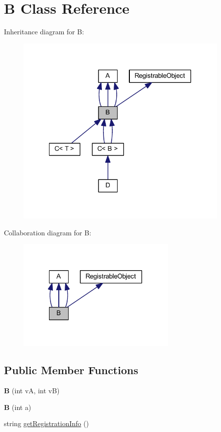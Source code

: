 \hypertarget{class_b}{
\section{B Class Reference}
\label{class_b}
}


Inheritance diagram for B:\nopagebreak
\begin{figure}[H]
\begin{center}
\leavevmode
\includegraphics[width=296pt]{class_b__inherit__graph}
\end{center}
\end{figure}


Collaboration diagram for B:\nopagebreak
\begin{figure}[H]
\begin{center}
\leavevmode
\includegraphics[width=221pt]{class_b__coll__graph}
\end{center}
\end{figure}
\subsection*{Public Member Functions}
\begin{DoxyCompactItemize}
\item 
\hypertarget{class_b_ab119ce136a0cb0a32835b580e65a5467}{
{\bfseries B} (int vA, int vB)}
\label{class_b_ab119ce136a0cb0a32835b580e65a5467}

\item 
\hypertarget{class_b_a649478177af5ec5962deac6fbbc6510b}{
{\bfseries B} (int a)}
\label{class_b_a649478177af5ec5962deac6fbbc6510b}

\item 
string \hyperlink{class_b_a92a1876b10f54eb21f9b36f2554d5d72}{getRegistrationInfo} ()
\end{DoxyCompactItemize}
